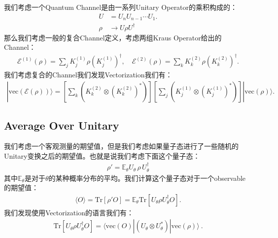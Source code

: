 \bigskip
{}

我们考虑一个Quantum Channel是由一系列Unitary Operator的乘积构成的：
\begin{align}
U&=U_nU_{n-1}\cdots U_1.\\
\rho&\longrightarrow U\rho U^\dagger
\end{align}
那么我们考虑一般的复合Channel定义，考虑两组Kraus Operator给出的Channel：
\begin{align}
  \mathcal{E}^{(1)}(\rho)=\sum_jK_j^{(1)}\rho\left(K_j^{(1)}\right)^\dagger,\quad\mathcal{E}^{(2)}(\rho)=\sum_kK_k^{(2)}\rho\left(K_k^{(2)}\right)^\dagger.
\end{align}
我们考虑复合的Channel我们发现Vectorization我们有：
\begin{align}
  |\mathrm{vec}(\mathcal{E}(\rho))\rangle=\left[\sum_k\left(K_k^{(2)}\otimes\left(K_k^{(2)}\right)^*\right)\right] \left[\sum_j\left(K_j^{(1)}\otimes\left(K_j^{(1)}\right)^*\right)\right]|\mathrm{vec}(\rho)\rangle.
\end{align}

\subsection{Average Over Unitary}


我们考虑一个客观测量的期望值，但是我们考虑如果量子态进行了一些随机的Unitary变换之后的期望值。也就是说我们考虑下面这个量子态：
\begin{align}
  \rho' = \mathbb{E}_{\theta} U_{\theta}\,\rho\,U_{\theta}^{\dagger}  
\end{align}
其中$ \mathbb{E}_\theta $是对于$ \theta $的某种概率分布的平均。我们计算这个量子态对于一个observable的期望值：
\begin{align}
  \langle O \rangle = \mathrm{Tr}{\left[\rho' O\right]} = \mathbb{E}_{\theta}\mathrm{Tr}{\left[U_{\theta}\rho U_{\theta}^{\dagger}O\right]}.
\end{align}
我们发现使用Vectorization的语言我们有：
\begin{align}
  \mathrm{Tr}{\left[U_{\theta}\rho U_{\theta}^{\dagger}O\right]}=\langle\mathrm{vec}(O)|\left(U_{\theta}\otimes U_{\theta}^{*}\right)|\mathrm{vec}(\rho)\rangle\mathrm{~.}
\end{align}

